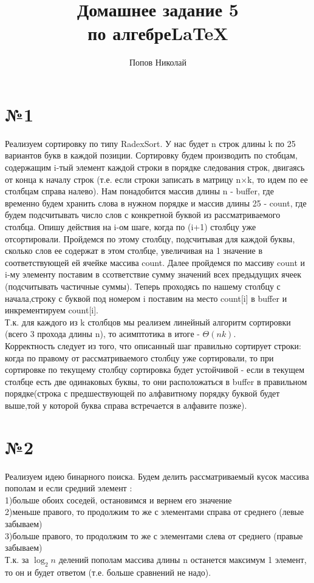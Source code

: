 \documentclass[a4paper,12pt]{article} %
\author{Попов Николай}
\title{Домашнее задание 5 \\ по алгебре\LaTeX{}}
\begin{document}


\section*{№1}
Реализуем сортировку по типу RadexSort. У нас будет n строк длины k по 25 вариантов букв в каждой позиции. Сортировку будем производить по стобцам, содержащим i-тый элемент каждой строки в порядке следования строк, двигаясь от конца к началу строк (т.е. если строки записать в матрицу n$\times$k, то идем по ее столбцам справа налево). Нам понадобится массив длины n - buffer, где временно будем хранить слова в нужном порядке и массив длины 25 - count, где будем подсчитывать число слов с конкретной буквой из рассматриваемого столбца. Опишу действия на i-ом шаге, когда по (i+1) столбцу уже отсортировали. Пройдемся по этому столбцу, подсчитывая для каждой буквы, сколько слов ее содержат в этом столбце, увеличивая на 1 значение в соответствующей ей ячейке массива count. Далее пройдемся по массиву count и i-му элементу поставим в ссответствие сумму значений всех предыдущих ячеек (подсчитывать частичные суммы). Теперь проходясь по нашему столбцу с начала,строку с буквой под номером i поставим на место count[i] в buffer и инкрементируем count[i].\\
Т.к. для каждого из k столбцов мы реализем линейный алгоритм сортировки (всего 3 прохода длины n), то асимптотика в итоге - $\Theta(nk)$.\\
Корректность следует из того, что описанный шаг правильно сортирует строки: когда по правому от рассматриваемого столбцу уже сортировали, то при сортировке по текущему столбцу сортировка будет устойчивой - если в текущем столбце есть две  одинаковых буквы, то они расположаться в buffer в правильном порядке(строка с предшествующей по алфавитному порядку буквой будет выше,той у которой буква справа встречается в алфавите позже).\\
 
\section*{№2}
Реализуем идею бинарного поиска. Будем делить рассматриваемый кусок массива пополам и если средний элемент :\\
1)больше обоих соседей, остановимся и вернем его значение\\
2)меньше правого, то продолжим то же с элементами справа от среднего (левые забываем)\\
3)больше правого, то продолжим то же с элементами слева от среднего (правые забываем)\\
Т.к. за $ \log_{2}{n} $ делений пополам массива длины n останется максимум 1 элемент, то он и будет ответом (т.е. больше сравнений не надо).\\	
\end{document}
